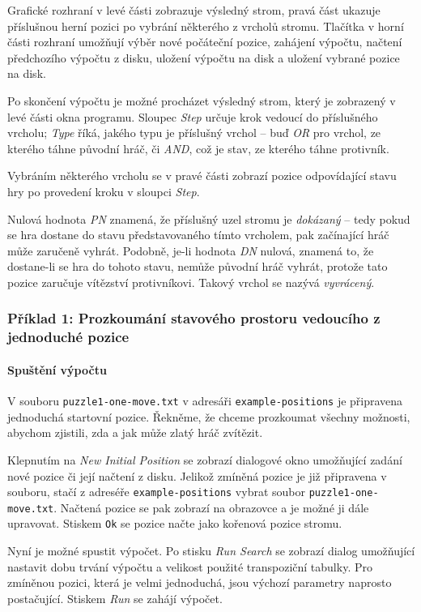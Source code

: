 \documentclass{article}
\begin{document}
Grafické rozhraní v levé části zobrazuje výsledný strom, pravá část ukazuje příslušnou herní pozici po vybrání některého
z vrcholů stromu. Tlačítka v horní části rozhraní umožňují výběr nové počáteční pozice, zahájení výpočtu, načtení
předchozího výpočtu z disku, uložení výpočtu na disk a uložení vybrané pozice na disk.

Po skončení výpočtu je možné procházet výsledný strom, který je zobrazený v levé části okna programu. Sloupec
\emph{Step} určuje krok vedoucí do příslušného vrcholu; \emph{Type} říká, jakého typu je příslušný vrchol -- buď
\emph{OR} pro vrchol, ze kterého táhne původní hráč, či \emph{AND}, což je stav, ze kterého táhne protivník.

Vybráním některého vrcholu se v pravé části zobrazí pozice odpovídající stavu hry po provedení kroku v sloupci
\emph{Step}.

Nulová hodnota \emph{PN} znamená, že příslušný uzel stromu je \emph{dokázaný} -- tedy pokud se hra dostane do stavu
představovaného tímto vrcholem, pak začínající hráč může zaručeně vyhrát. Podobně, je-li hodnota \emph{DN} nulová,
znamená to, že dostane-li se hra do tohoto stavu, nemůže původní hráč vyhrát, protože tato pozice zaručuje vítězství
protivníkovi. Takový vrchol se nazývá \emph{vyvrácený}.

\subsubsection{Příklad 1: Prozkoumání stavového prostoru vedoucího z jednoduché pozice}
\paragraph{Spuštění výpočtu}
V souboru \texttt{puzzle1-one-move.txt} v adresáři \texttt{example-positions} je připravena jednoduchá startovní pozice.
Řekněme, že chceme prozkoumat všechny možnosti, abychom zjistili, zda a jak může zlatý hráč zvítězit.

Klepnutím na \emph{New Initial Position} se zobrazí dialogové okno umožňující zadání nové pozice či její načtení z
disku. Jelikož zmíněná pozice je již připravena v souboru, stačí z adreséře \texttt{example-positions} vybrat soubor
\texttt{puzzle1-{}one-{}move.txt}. Načtená pozice se pak zobrazí na obrazovce a je možné ji dále upravovat. Stiskem
\texttt{Ok} se pozice načte jako kořenová pozice stromu.

Nyní je možné spustit výpočet. Po stisku \emph{Run Search} se zobrazí dialog umožňující nastavit dobu trvání výpočtu
a velikost použité transpoziční tabulky. Pro zmíněnou pozici, která je velmi jednoduchá, jsou výchozí parametry naprosto
postačující. Stiskem \emph{Run} se zahájí výpočet.
\end{document}
